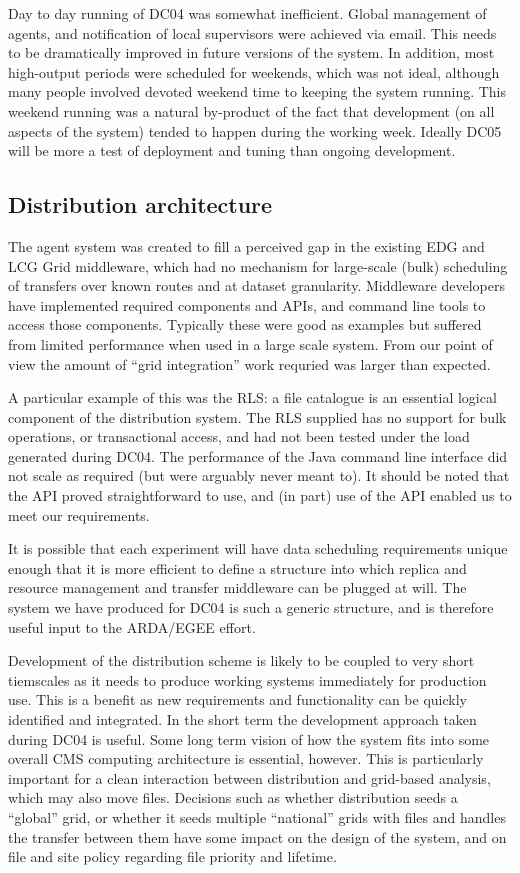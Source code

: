 \documentclass{cmspaper}
\begin{document}
Day to day running of DC04 was somewhat inefficient. Global management
of agents, and notification of local supervisors were achieved via
email. This needs to be dramatically improved in future versions of
the system. In addition, most high-output periods were scheduled for
weekends, which was not ideal, although many people involved devoted
weekend time to keeping the system running. This weekend running was
a natural by-product of the fact that development (on all aspects of
the system) tended to happen during the working week. Ideally DC05
will be more a test of deployment and tuning than ongoing development.

\subsection{Distribution architecture}
The agent system was created to fill a perceived gap in the existing
EDG and LCG Grid middleware, which had no mechanism for large-scale
(bulk) scheduling of transfers over known routes and at dataset
granularity. Middleware developers have implemented required
components and APIs, and command line tools to access those
components. Typically these were good as examples but suffered from
limited performance when used in a large scale system. From our point
of view the amount of ``grid integration'' work requried was larger
than expected.

A particular example of this was the RLS: a file catalogue is an
essential logical component of the distribution system. The RLS
supplied has no support for bulk operations, or transactional access,
and had not been tested under the load generated during DC04.  The
performance of the Java command line interface did not scale as
required (but were arguably never meant to). It should be noted that
the API proved straightforward to use, and (in part) use of the API
enabled us to meet our requirements.

It is possible that each experiment will have data scheduling
requirements unique enough that it is more efficient to define a
structure into which replica and resource management and transfer
middleware can be plugged at will. The system we have produced for
DC04 is such a generic structure, and is therefore useful input to the
ARDA/EGEE effort.

Development of the distribution scheme is likely to be coupled to very
short tiemscales as it needs to produce working systems immediately
for production use. This is a benefit as new requirements and
functionality can be quickly identified and integrated. In the short
term the development approach taken during DC04 is useful. Some long
term vision of how the system fits into some overall CMS computing
architecture is essential, however. This is particularly important for
a clean interaction between distribution and grid-based analysis,
which may also move files. Decisions such as whether distribution
seeds a ``global'' grid, or whether it seeds multiple ``national''
grids with files and handles the transfer between them have some
impact on the design of the system, and on file and site policy
regarding file priority and lifetime.
\end{document}
